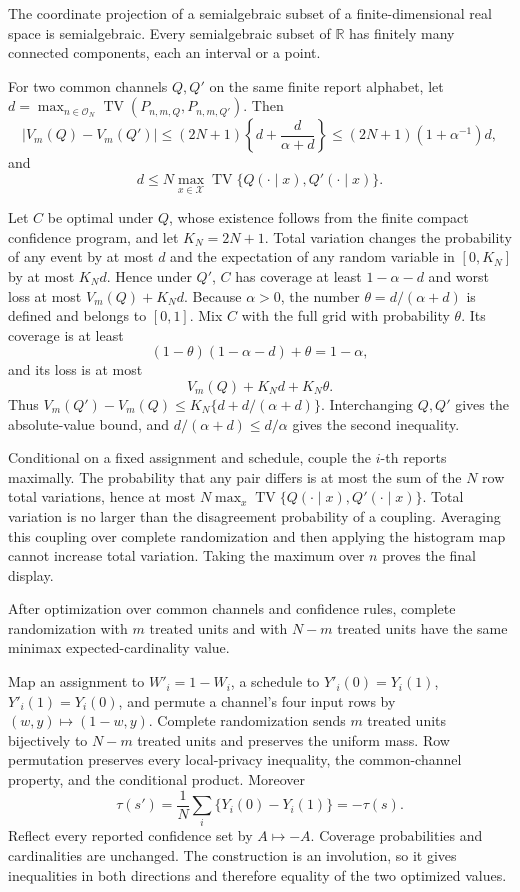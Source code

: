 The coordinate projection of a semialgebraic subset of a finite-dimensional real space is semialgebraic.  Every semialgebraic subset of \(\mathbb R\) has finitely many connected components, each an interval or a point.

For two common channels \(Q,Q'\) on the same finite report alphabet, let \(d=\max_{n\in\mathcal O_N}\operatorname{TV}(P_{n,m,Q},P_{n,m,Q'})\).  Then
\[
 |V_m(Q)-V_m(Q')|\le(2N+1)\left\{d+\frac d{\alpha+d}\right\}
 \le(2N+1)(1+\alpha^{-1})d,
\]
and
\[
 d\le N\max_{x\in\mathcal X}\operatorname{TV}\{Q(\cdot\mid x),Q'(\cdot\mid x)\}.
\]

Let \(C\) be optimal under \(Q\), whose existence follows from the finite compact confidence program, and let \(K_N=2N+1\).  Total variation changes the probability of any event by at most \(d\) and the expectation of any random variable in \([0,K_N]\) by at most \(K_Nd\).  Hence under \(Q'\), \(C\) has coverage at least \(1-\alpha-d\) and worst loss at most \(V_m(Q)+K_Nd\).  Because \(\alpha>0\), the number \(\theta=d/(\alpha+d)\) is defined and belongs to \([0,1]\).  Mix \(C\) with the full grid with probability \(\theta\).  Its coverage is at least
\[
 (1-\theta)(1-\alpha-d)+\theta=1-\alpha,
\]
and its loss is at most
\[
 V_m(Q)+K_Nd+K_N\theta.
\]
Thus \(V_m(Q')-V_m(Q)\le K_N\{d+d/(\alpha+d)\}\).  Interchanging \(Q,Q'\) gives the absolute-value bound, and \(d/(\alpha+d)\le d/\alpha\) gives the second inequality.

Conditional on a fixed assignment and schedule, couple the \(i\)-th reports maximally.  The probability that any pair differs is at most the sum of the \(N\) row total variations, hence at most \(N\max_x\operatorname{TV}\{Q(\cdot\mid x),Q'(\cdot\mid x)\}\).  Total variation is no larger than the disagreement probability of a coupling.  Averaging this coupling over complete randomization and then applying the histogram map cannot increase total variation.  Taking the maximum over \(n\) proves the final display.

After optimization over common channels and confidence rules, complete randomization with \(m\) treated units and with \(N-m\) treated units have the same minimax expected-cardinality value.

Map an assignment to \(W'_i=1-W_i\), a schedule to \(Y'_i(0)=Y_i(1)\), \(Y'_i(1)=Y_i(0)\), and permute a channel's four input rows by \((w,y)\mapsto(1-w,y)\).  Complete randomization sends \(m\) treated units bijectively to \(N-m\) treated units and preserves the uniform mass.  Row permutation preserves every local-privacy inequality, the common-channel property, and the conditional product.  Moreover
\[
 \tau(s')=\frac1N\sum_i\{Y_i(0)-Y_i(1)\}=-\tau(s).
\]
Reflect every reported confidence set by \(A\mapsto-A\).  Coverage probabilities and cardinalities are unchanged.  The construction is an involution, so it gives inequalities in both directions and therefore equality of the two optimized values.

